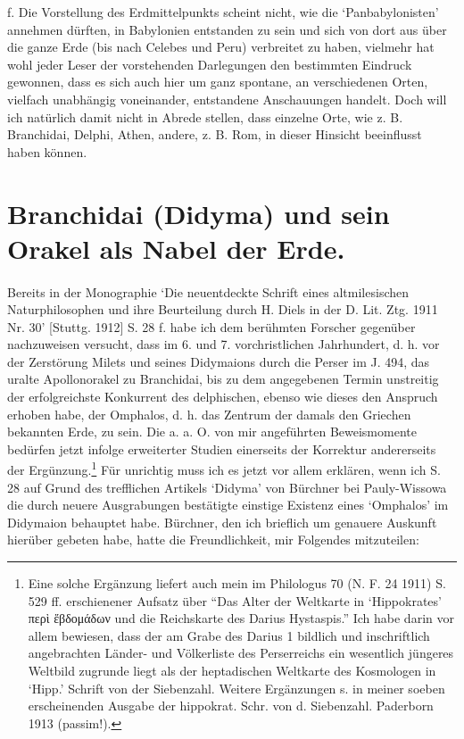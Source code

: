 \documentclass[a4paper, 11pt, oneside]{article}
\begin{document}
f. Die Vorstellung des Erdmittelpunkts scheint nicht, wie die `Panbabylonisten' annehmen dürften, in Babylonien entstanden zu sein und sich von dort aus über die ganze Erde (bis nach Celebes und Peru) verbreitet zu haben, vielmehr hat wohl jeder Leser der vorstehenden Darlegungen den bestimmten Eindruck gewonnen, dass es sich auch hier um ganz spontane, an verschiedenen Orten, vielfach unabhängig voneinander, entstandene Anschauungen handelt. Doch will ich natürlich damit nicht in Abrede stellen, dass einzelne Orte, wie z. B. Branchidai, Delphi, Athen, andere, z. B. Rom, in dieser Hinsicht beeinflusst haben können.
\clearpage
\section{Branchidai (Didyma) und sein Orakel als Nabel der Erde.}
\paragraph{}
Bereits in der Monographie `Die neuentdeckte Schrift eines altmilesischen Naturphilosophen und ihre Beurteilung durch H. Diels in der D. Lit. Ztg. 1911 Nr. 30' [Stuttg. 1912] S. 28 f. habe ich dem berühmten Forscher gegenüber nachzuweisen versucht, dass im 6. und 7. vorchristlichen Jahrhundert, d. h. vor der Zerstörung Milets und seines Didymaions durch die Perser im J. 494, das uralte Apollonorakel zu Branchidai, bis zu dem angegebenen Termin unstreitig der erfolgreichste Konkurrent des delphischen, ebenso wie dieses den Anspruch erhoben habe, der Omphalos, d. h. das Zentrum der damals den Griechen bekannten Erde, zu sein. Die a. a. O. von mir angeführten Beweismomente bedürfen jetzt infolge erweiterter Studien einerseits der Korrektur andererseits der Ergünzung.\footnote{Eine solche Ergänzung liefert auch mein im Philologus 70 (N. F. 24 1911) S. 529 ff. erschienener Aufsatz über "`Das Alter der Weltkarte in `Hippokrates' περὶ ἕβδομάδων und die Reichskarte des Darius Hystaspis."' Ich habe darin vor allem bewiesen, dass der am Grabe des Darius 1 bildlich und inschriftlich angebrachten Länder- und Völkerliste des Perserreichs ein wesentlich jüngeres Weltbild zugrunde liegt als der heptadischen Weltkarte des Kosmologen in `Hipp.' Schrift von der Siebenzahl. Weitere Ergänzungen s. in meiner soeben erscheinenden Ausgabe der hippokrat. Schr. von d. Siebenzahl. Paderborn 1913 (passim!).} Für unrichtig muss ich es jetzt vor allem erklären, wenn ich S. 28 auf Grund des trefflichen Artikels `Didyma' von Bürchner bei Pauly-Wissowa die durch neuere Ausgrabungen bestätigte einstige Existenz eines `Omphalos' im Didymaion behauptet habe. Bürchner, den ich brieflich um genauere Auskunft hierüber gebeten habe, hatte die Freundlichkeit, mir Folgendes mitzuteilen:
\end{document}
